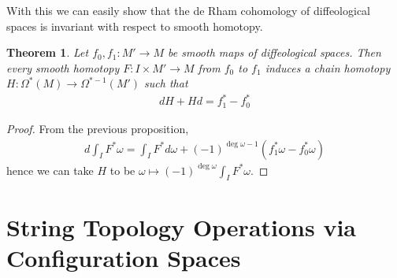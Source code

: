 \documentclass{scrartcl}
\theoremstyle{plain}
\newtheorem{theorem}{Theorem}[section]
\theoremstyle{definition}
\newtheorem{definition}[theorem]{Definition}
\begin{document}
With this we can easily show that the de Rham cohomology of diffeological spaces is invariant with respect to smooth homotopy.
\begin{theorem}
    Let $f_0, f_1\colon M'\to M$ be smooth maps of diffeological spaces. Then every smooth homotopy $F\colon I\times M'\to M$ from $f_0$ to $f_1$ induces a chain homotopy $H\colon \Omega^*(M)\to \Omega^{*-1}(M')$ such that 
    \begin{align*}
        dH + H d = f_1^* - f_0^*
    \end{align*}
\end{theorem}
\begin{proof}
    From the previous proposition,
    \begin{align*}
        d \int_I F^*\omega = \int_I F^*d\omega + (-1)^{\deg\omega - 1} (f_1^*\omega - f_0^*\omega)
    \end{align*}
    hence we can take $H$ to be $\omega\mapsto (-1)^{\deg\omega}\int_I F^*\omega$.
\end{proof}









\section{String Topology Operations via Configuration Spaces}
\end{document}
